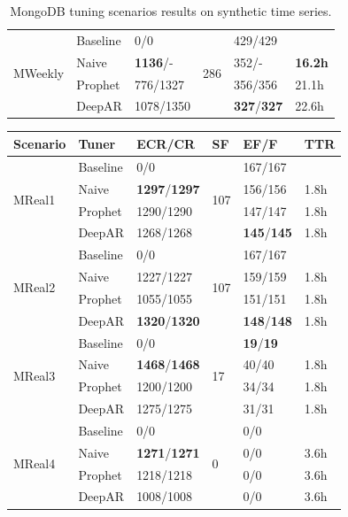 \documentclass[a4paper, 12pt]{article} %
\newcommand{\ra}[1]{\renewcommand{\arraystretch}{#1}}
\begin{document}
\begin{table}
\begin{tabularx}{\textwidth}{@{}XXXXXX@{}}
			\midrule
			\multirow{4}{*}{MWeekly}
			& Baseline & 0/0 & \multirow{4}{*}{286} & 429/429 & \\
			& Naive & \textbf{1136}/- && 352/- & \textbf{16.2h} \\
			& Prophet & 776/1327 && 356/356 & 21.1h\\
			& DeepAR & 1078/1350 && \textbf{327}/\textbf{327} & 22.6h\\
			
			\bottomrule
		\end{tabularx}
		\caption{MongoDB tuning scenarios results on synthetic time series. } \label{table:results_mongo_synthetic}
	\end{table}

	\begin{table}\centering 
		\ra{1.3}
		\begin{tabularx}{\textwidth}{@{}XXXXXX@{}}
			\toprule
			Scenario & Tuner & ECR/CR & SF & EF/F & TTR\\

			\midrule
			\multirow{4}{*}{MReal1}
			& Baseline & 0/0 & \multirow{4}{*}{107} & 167/167 & \\
			& Naive & \textbf{1297}/\textbf{1297} && 156/156 & 1.8h \\
			& Prophet & 1290/1290 && 147/147 & 1.8h\\
			& DeepAR & 1268/1268 && \textbf{145}/\textbf{145} & 1.8h\\
			
			\midrule
			\multirow{4}{*}{MReal2}
			& Baseline & 0/0 & \multirow{4}{*}{107} & 167/167 & \\
			& Naive & 1227/1227 && 159/159 & 1.8h \\
			& Prophet & 1055/1055 && 151/151 & 1.8h\\
			& DeepAR & \textbf{1320}/\textbf{1320} && \textbf{148}/\textbf{148} & 1.8h\\
			
			\midrule
			\multirow{4}{*}{MReal3}
			& Baseline & 0/0 & \multirow{4}{*}{17} & \textbf{19}/\textbf{19} & \\
			& Naive & \textbf{1468}/\textbf{1468} && 40/40 & 1.8h \\
			& Prophet & 1200/1200 && 34/34 & 1.8h\\
			& DeepAR & 1275/1275 && 31/31 & 1.8h\\
			
			\midrule
			\multirow{4}{*}{MReal4}
			& Baseline & 0/0 & \multirow{4}{*}{0} & 0/0 & \\
			& Naive & \textbf{1271}/\textbf{1271} && 0/0 & 3.6h \\
			& Prophet & 1218/1218 && 0/0 & 3.6h\\
			& DeepAR & 1008/1008 && 0/0 & 3.6h\\
			

\end{tabularx}
\end{table}
\end{document}
